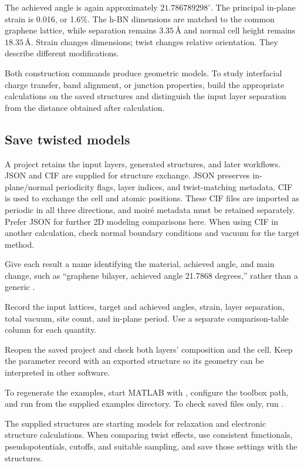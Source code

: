The achieved angle is again approximately $21.786789298^\circ$. The principal in-plane strain is 0.016, or 1.6\%. The h-BN dimensions are matched to the common graphene lattice, while separation remains $3.35\,\text{\AA}$ and normal cell height remains $18.35\,\text{\AA}$. Strain changes dimensions; twist changes relative orientation. They describe different modifications.

Both construction commands produce geometric models. To study interfacial charge transfer, band alignment, or junction properties, build the appropriate calculations on the saved structures and distinguish the input layer separation from the distance obtained after calculation.

\subsection{Save twisted models}

A project retains the input layers, generated structures, and later workflows. JSON and CIF are supplied for structure exchange. JSON preserves in-plane/normal periodicity flags, layer indices, and twist-matching metadata. CIF is used to exchange the cell and atomic positions. These CIF files are imported as periodic in all three directions, and moiré metadata must be retained separately. Prefer JSON for further 2D modeling comparisons here. When using CIF in another calculation, check normal boundary conditions and vacuum for the target method.

\begin{steps}
  \item Give each result a name identifying the material, achieved angle, and main change, such as ``graphene bilayer, achieved angle 21.7868 degrees,'' rather than a generic .
  \item Record the input lattices, target and achieved angles, strain, layer separation, total vacuum, site count, and in-plane period. Use a separate comparison-table column for each quantity.
  \item Reopen the saved project and check both layers' composition and the cell. Keep the parameter record with an exported structure so its geometry can be interpreted in other software.
  \item To regenerate the examples, start MATLAB\regmark{} with , configure the toolbox path, and run  from the supplied examples directory. To check saved files only, run .
\end{steps}

The supplied structures are starting models for relaxation and electronic structure calculations. When comparing twist effects, use consistent functionals, pseudopotentials, cutoffs, and suitable sampling, and save those settings with the structures.
